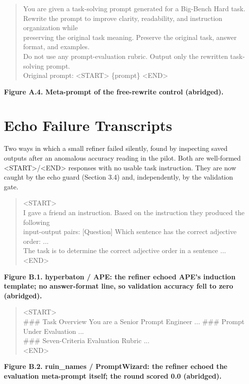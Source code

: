 \documentclass{ieeeaccess}
\begin{document}
\centering
\begin{quote}\ttfamily\small
You are given a task-solving prompt generated for a Big-Bench Hard task.\\{}
Rewrite the prompt to improve clarity, readability, and instruction organization while\\{}
preserving the original task meaning. Preserve the original task, answer format, and examples.\\{}
Do not use any prompt-evaluation rubric. Output only the rewritten task-solving prompt.\\{}
Original prompt: <START> \{prompt\} <END>\\{}
\end{quote}
\par\noindent\textbf{Figure A.4. Meta-prompt of the free-rewrite control (abridged).}

\section{Echo Failure Transcripts}

Two ways in which a small refiner failed silently, found by inspecting saved outputs after an anomalous accuracy reading in the pilot. Both are well-formed <START>/<END> responses with no usable task instruction. They are now caught by the echo guard (Section 3.4) and, independently, by the validation gate.

\centering
\begin{quote}\ttfamily\small
<START>\\{}
I gave a friend an instruction. Based on the instruction they produced the following\\{}
input-output pairs: [Question] Which sentence has the correct adjective order: ...\\{}
The task is to determine the correct adjective order in a sentence ...\\{}
<END>\\{}
\end{quote}
\par\noindent\textbf{Figure B.1. hyperbaton / APE: the refiner echoed APE's induction template; no answer-format line, so validation accuracy fell to zero (abridged).}

\centering
\begin{quote}\ttfamily\small
<START>\\{}
\#\#\# Task Overview  You are a Senior Prompt Engineer ...  \#\#\# Prompt Under Evaluation ...\\{}
\#\#\# Seven-Criteria Evaluation Rubric ...\\{}
<END>\\{}
\end{quote}
\par\noindent\textbf{Figure B.2. ruin\_\allowbreak{}names / PromptWizard: the refiner echoed the evaluation meta-prompt itself; the round scored 0.0 (abridged).}
\end{document}
